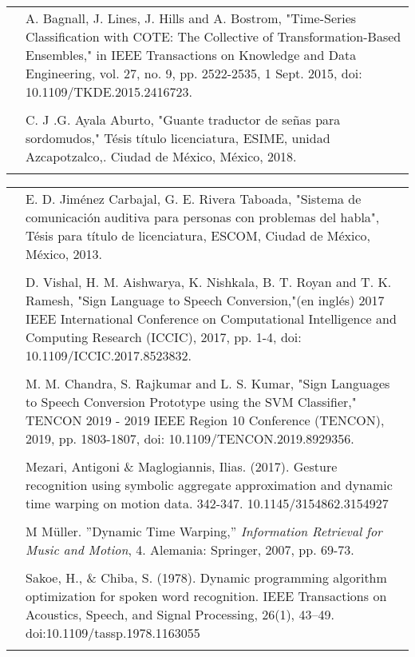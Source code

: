 \documentclass[10pt]{article}
\begin{document}
\begin{multicols}{2}
\begin{tabular}{p{0.5cm} p{7cm}}
			\text{[8]} & A. Bagnall, J. Lines, J. Hills and A. Bostrom, "Time-Series Classification with COTE: The Collective of Transformation-Based Ensembles," in IEEE Transactions on Knowledge and Data Engineering, vol. 27, no. 9, pp. 2522-2535, 1 Sept. 2015, doi: 10.1109/TKDE.2015.2416723. \\ \\
			
			\text{[9]} & C. J .G. Ayala Aburto, "Guante traductor de señas para sordomudos," Tésis título licenciatura, ESIME, unidad Azcapotzalco,. Ciudad de México, México, 2018. \\ \\
		\end{tabular}
			
		\begin{tabular}{p{0.5cm} p{7cm}}
			\text{[10]} & E. D. Jiménez Carbajal, G. E. Rivera Taboada, "Sistema de comunicación auditiva para personas con problemas del habla", Tésis para título de licenciatura, ESCOM, Ciudad de México, México, 2013. \\ \\
			
			\text{[11]} & D. Vishal, H. M. Aishwarya, K. Nishkala, B. T. Royan and T. K. Ramesh, "Sign Language to Speech Conversion,"(en inglés) 2017 IEEE International Conference on Computational Intelligence and Computing Research (ICCIC), 2017, pp. 1-4, doi: 10.1109/ICCIC.2017.8523832. \\ \\
			
			\text{[12]} & M. M. Chandra, S. Rajkumar and L. S. Kumar, "Sign Languages to Speech Conversion Prototype using the SVM Classifier," TENCON 2019 - 2019 IEEE Region 10 Conference (TENCON), 2019, pp. 1803-1807, doi: 10.1109/TENCON.2019.8929356. \\ \\
			
			\text{[13]} & Mezari, Antigoni \& Maglogiannis, Ilias. (2017). Gesture recognition using symbolic aggregate approximation and dynamic time warping on motion data. 342-347. 10.1145/3154862.3154927 \\ \\
			
			\text{[14]} & M Müller. ''Dynamic Time Warping,'' \textit{Information Retrieval for Music and Motion}, 4. Alemania: Springer, 2007, pp. 69-73. \\ \\
			
			\text{[15]} & Sakoe, H., \& Chiba, S. (1978). Dynamic programming algorithm optimization for spoken word recognition. IEEE Transactions on Acoustics, Speech, and Signal Processing, 26(1), 43–49. doi:10.1109/tassp.1978.1163055 \\ \\
			

\end{tabular}
\end{multicols}
\end{document}
